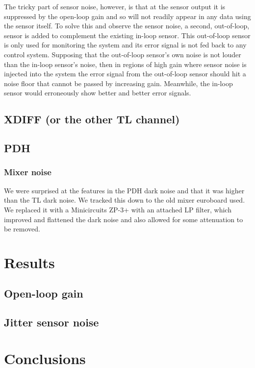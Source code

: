\documentclass[aps,pra,superscriptaddress,reprint,nofootinbib]{revtex4-1}
\begin{document}
The tricky part of sensor noise, however, is that at the sensor output it is suppressed by the open-loop gain and so will not readily appear in any data using the sensor itself. To solve this and observe the sensor noise, a second, out-of-loop, sensor is added to complement the existing in-loop sensor. This out-of-loop sensor is only used for monitoring the system and its error signal is not fed back to any control system. Supposing that the out-of-loop sensor’s own noise is not louder than the in-loop sensor’s noise, then in regions of high gain where sensor noise is injected into the system the error signal from the out-of-loop sensor should hit a noise floor that cannot be passed by increasing gain. Meanwhile, the in-loop sensor would erroneously show better and better error signals.


\subsection{XDIFF (or the other TL channel)}


\subsection{PDH}


\subsubsection{Mixer noise}

We were surprised at the features in the PDH dark noise and that it was higher than the TL dark noise. We tracked this down to the old mixer euroboard used. We replaced it with a Minicircuits ZP-3+ with an attached LP filter, which improved and flattened the dark noise and also allowed for some attenuation to be removed.


\section{Results}
\label{sec:results}

\subsection{Open-loop gain}


\subsection{Jitter sensor noise}



\section{Conclusions}
\label{sec:conclusions}



\nocite{*}


\end{document}
